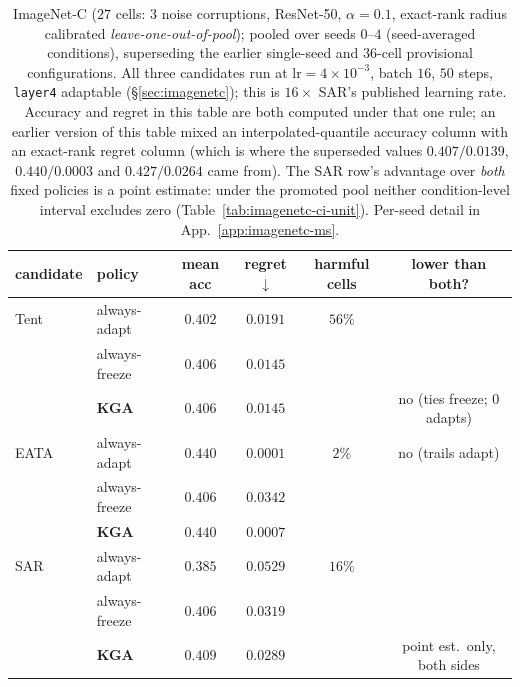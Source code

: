 \begin{table}[t]\centering\small
\begin{tabular}{llcccc}
\toprule
candidate & policy & mean acc & regret$\downarrow$ & harmful cells & lower than both? \\
\midrule
Tent & always-adapt     & $0.402$          & $0.0191$ & $56\%$ & \\
     & always-freeze    & $0.406$          & $0.0145$ &        & \\
     & \textbf{\textsc{KGA}} & $0.406$ & $0.0145$ & & no (ties freeze; $0$ adapts) \\
\midrule
EATA & always-adapt     & $\mathbf{0.440}$ & $\mathbf{0.0001}$ & $2\%$  & no (trails adapt) \\
     & always-freeze    & $0.406$          & $0.0342$ &        & \\
     & \textbf{\textsc{KGA}} & $0.440$ & $0.0007$ &        & \\
\midrule
SAR  & always-adapt     & $0.385$          & $0.0529$ & $16\%$ & \\
     & always-freeze    & $0.406$          & $0.0319$ &        & \\
     & \textbf{\textsc{KGA}} & $\mathbf{0.409}$ & $\mathbf{0.0289}$ & & point est.\ only, both sides \\
\bottomrule
\end{tabular}
\caption{ImageNet-C ($27$ cells: 3 noise corruptions, ResNet-50,
$\alpha{=}0.1$, exact-rank radius calibrated \emph{leave-one-out-of-pool}); pooled over seeds
$0$--$4$ (seed-averaged conditions), superseding the earlier
single-seed and 36-cell provisional configurations. All three candidates run at
$\mathrm{lr}=4\times10^{-3}$, batch $16$, $50$ steps, \texttt{layer4} adaptable
(\S\ref{sec:imagenetc}); this is $16\times$ SAR's published learning rate. Accuracy and regret in
this table are both computed under that one rule; an earlier version of this table mixed an
interpolated-quantile accuracy column with an exact-rank regret column (which is where the
superseded values $0.407/0.0139$, $0.440/0.0003$ and $0.427/0.0264$ came from). The SAR row's
advantage over \emph{both} fixed policies is a point estimate: under the promoted pool neither
condition-level interval excludes zero (Table~\ref{tab:imagenetc-ci-unit}). Per-seed detail in
App.~\ref{app:imagenetc-ms}.}
\label{tab:imagenetc-faithful}
\end{table}

